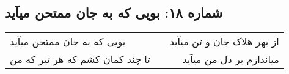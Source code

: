 \begin{center}
\section*{شماره ۱۸: بویی که به جان ممتحن میآید}
\label{sec:018}
\begin{longtable}{l p{0.5cm} r}
بویی که به جان ممتحن میآید
&&
از بهر هلاک جان و تن میآید
\\
تا چند کمان کشم که هر تیر که من
&&
میاندازم بر دل من میآید
\\
\end{longtable}
\end{center}
